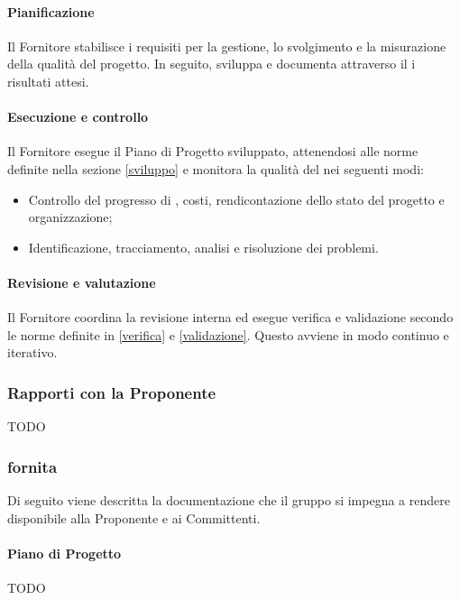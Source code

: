 \paragraph{Pianificazione}
Il Fornitore stabilisce i requisiti per la gestione, lo svolgimento e la misurazione della qualità del progetto. In seguito, sviluppa e documenta attraverso il  i risultati attesi.

\paragraph{Esecuzione e controllo}
Il Fornitore esegue il Piano di Progetto sviluppato, attenendosi alle norme definite nella sezione \ref{sviluppo} e monitora la qualità del  nei seguenti modi:
\begin{itemize}
  \item Controllo del progresso di , costi, rendicontazione dello stato del progetto e organizzazione;
  \item Identificazione, tracciamento, analisi e risoluzione dei problemi.
\end{itemize}

\paragraph{Revisione e valutazione}
Il Fornitore coordina la revisione interna ed esegue verifica e validazione secondo le norme definite in \ref{verifica} e \ref{validazione}. Questo avviene in modo continuo e iterativo.



\subsubsection{Rapporti con la Proponente}
TODO

\subsubsection{ fornita}\label{documentazionefornita}
Di seguito viene descritta la documentazione che il gruppo si impegna a rendere disponibile alla Proponente e ai Committenti.

\paragraph{Piano di Progetto}
TODO

